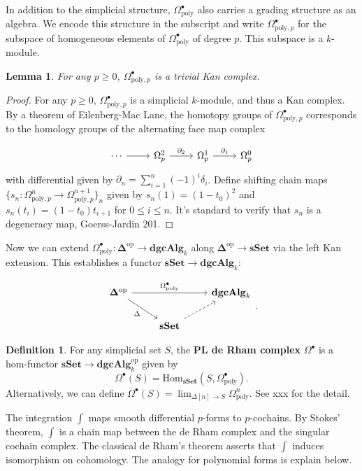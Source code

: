 \documentclass[psamsfonts]{amsart}
\newtheorem{lem}{Lemma}[section]
\theoremstyle{definition}
\newtheorem{defn}{Definition}[section]
\newcommand{\sSet}{\mathbf{sSet}}
\newcommand{\dgcAlg}{\mathbf{dgcAlg}}
\newcommand{\Hom}{\mathrm{Hom}}
\numberwithin{equation}{section}
\begin{document}
In addition to the simplicial structure, $\Omega^\bullet_\textrm{poly}$ also carries a grading structure as an algebra. We encode this structure in the subscript and write $\Omega^\bullet_{\textrm{poly},p}$ for the subspace of homogeneous elements of $\Omega^\bullet_\textrm{poly}$ of degree $p$. This subspace is a $k$-module.

\begin{lem}
For any $p\geq0$, $\Omega^\bullet_{\mathrm{poly},p}$ is a trivial Kan complex.
\end{lem}
\begin{proof}
For any $p\geq0$, $\Omega^\bullet_{\textrm{poly},p}$ is a simplicial $k$-module, and thus a Kan complex. By a theorem of Eilenberg-Mac Lane, the homotopy groups of $\Omega^\bullet_{\textrm{poly},p}$ corresponds to the homology groups of the alternating face map complex

\[\begin{tikzcd}
\cdots\arrow[r]&\Omega^2_p\arrow[r,"\partial_2"]&\Omega^1_p\arrow[r,"\partial_1"]&\Omega^0_p\end{tikzcd}\]
with differential given by $\partial_n=\sum_{i=1}^n(-1)^i\delta_i$. Define shifting chain maps $\{s_n:\Omega^n_{\textrm{poly},p}\to\Omega^{n+1}_{\textrm{poly},p}\}_{n}$ given by $s_n(1)=(1-t_0)^2$ and $s_n(t_i)=(1-t_0)t_{i+1}$ for $0\leq i\leq n$. It's standard to verify that $s_n$ is a degeneracy map, Goerss-Jardin 201. 
\end{proof}

Now we can extend $\Omega^\bullet_\textrm{poly}:\mathbf{\Delta}^\textrm{op}\to\dgcAlg_k$ along $\mathbf{\Delta}^\textrm{op}\to\sSet$ via the left Kan extension. This establishes a functor $\sSet\to\dgcAlg_k$:

\[\begin{tikzcd}
\mathbf{\Delta}^\textrm{op}\arrow[swap]{dr}{\Delta}\arrow{rr}{\Omega^\bullet_\textrm{poly}}&&\dgcAlg_k\\
&\sSet\arrow[swap,near start,dashed]{ur}
\end{tikzcd}.\]

\begin{defn}
For any simplicial set $S$, the \textbf{PL de Rham complex} $\Omega^\bullet$ is a hom-functor $\sSet\to\dgcAlg_k^\mathrm{op}$ given by
\[\Omega^\bullet(S)=\Hom_\sSet(S,\Omega^\bullet_\textrm{poly}).\]
Alternatively, we can define $\Omega^\bullet(S)=\lim_{\Delta[n]\to S}\Omega^n_\textrm{poly}$. See xxx for the detail.
\end{defn}

The integration $\int$ maps smooth differential $p$-forms to $p$-cochains. By Stokes' theorem, $\int$ is a chain map between the de Rham complex and the singular cochain complex. The classical de Rham's theorem asserts that $\int$ induces isomorphism on cohomology. The analogy for polynomial forms is explain below.
\end{document}
